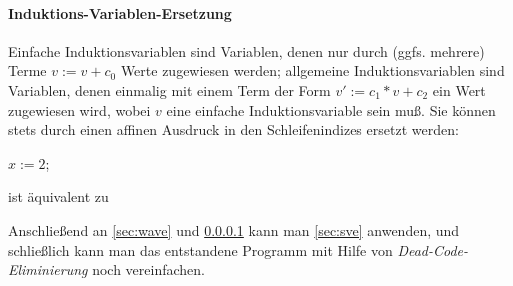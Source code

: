\paragraph{Induktions-Variablen-Ersetzung}
\label{sec:ive}

Einfache Induktionsvariablen sind Variablen, denen nur durch (ggfs.
mehrere) Terme $v := v + c_0$ Werte zugewiesen werden; allgemeine
Induktionsvariablen sind Variablen, denen einmalig mit einem Term der
Form $v':= c_1*v + c_2$ ein Wert zugewiesen wird, wobei $v$ eine
einfache Induktionsvariable sein muß.  Sie können stets durch einen
affinen Ausdruck in den Schleifenindizes
ersetzt werden:\\

\begin{minipage}[c]{4cm}
    \begin{algorithm}[H]
        \( x:= 2 \);\\
    \end{algorithm}
\end{minipage}
%
\begin{minipage}[c]{4cm}
\centerline{ist äquivalent zu}
\end{minipage}
%
\begin{minipage}[c]{4cm}
    \begin{algorithm}[H]
    \end{algorithm}
\end{minipage}

\bigskip
Anschließend an \ref{sec:wave} und \ref{sec:ive} kann man \ref{sec:sve}
anwenden, und schließlich kann man das entstandene Programm mit Hilfe von
\emph{Dead-Code-Eliminierung} noch vereinfachen.


